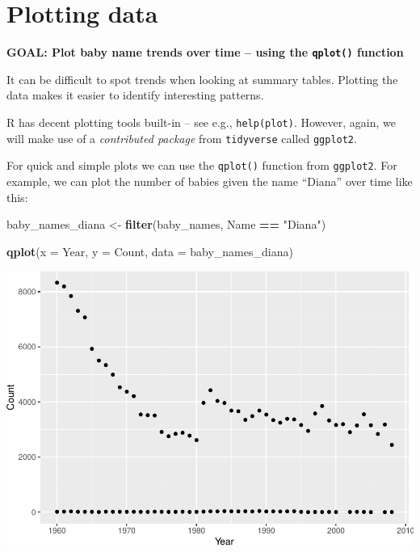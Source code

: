 \documentclass[
]{book}
\newenvironment{Shaded}{\begin{snugshade}}{\end{snugshade}}
\newcommand{\DataTypeTok}[1]{\textcolor[rgb]{0.13,0.29,0.53}{#1}}
\newcommand{\KeywordTok}[1]{\textcolor[rgb]{0.13,0.29,0.53}{\textbf{#1}}}
\newcommand{\NormalTok}[1]{#1}
\newcommand{\OperatorTok}[1]{\textcolor[rgb]{0.81,0.36,0.00}{\textbf{#1}}}
\newcommand{\StringTok}[1]{\textcolor[rgb]{0.31,0.60,0.02}{#1}}
\begin{document}
\hypertarget{plotting-data}{%
\section{Plotting data}\label{plotting-data}}

\textbf{GOAL: Plot baby name trends over time -- using the \texttt{qplot()} function}

It can be difficult to spot trends when looking at summary tables.
Plotting the data makes it easier to identify interesting patterns.

R has decent plotting tools built-in -- see e.g., \texttt{help(plot)}.
However, again, we will make use of a \emph{contributed
package} from \texttt{tidyverse} called \texttt{ggplot2}.

For quick and simple plots we can use the \texttt{qplot()} function from \texttt{ggplot2}. For example,
we can plot the number of babies given the name ``Diana'' over time like this:

\begin{Shaded}
\begin{Highlighting}[]
\NormalTok{baby_names_diana <-}\StringTok{ }\KeywordTok{filter}\NormalTok{(baby_names, Name }\OperatorTok{==}\StringTok{ "Diana"}\NormalTok{)}
\end{Highlighting}
\end{Shaded}

\begin{Shaded}
\begin{Highlighting}[]
\KeywordTok{qplot}\NormalTok{(}\DataTypeTok{x =}\NormalTok{ Year, }\DataTypeTok{y =}\NormalTok{ Count,}
     \DataTypeTok{data =}\NormalTok{ baby_names_diana)}
\end{Highlighting}
\end{Shaded}

\includegraphics{R/Rintro/figures/unnamed-chunk-31-1.pdf}
\end{document}
